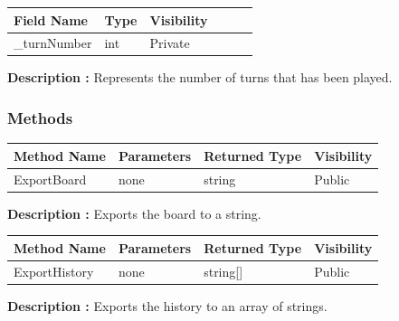 \documentclass[12pt]{article}
\begin{document}
\begin{table}[H]
    \begin{tabular}{llllll}
    \hline
    \multicolumn{1}{|l|}{\cellcolor[HTML]{EFEFEF}\textbf{Field Name}} & \multicolumn{1}{l|}{\cellcolor[HTML]{EFEFEF}\textbf{Type}} & \multicolumn{1}{l|}{\cellcolor[HTML]{EFEFEF}\textbf{Visibility}} \\ \hline
    \multicolumn{1}{|l|}{\_turnNumber}                                & \multicolumn{1}{l|}{int}                                   & \multicolumn{1}{l|}{Private}                                     \\ \hline
    \end{tabular}
\end{table}

\textbf{Description :} Represents the number of turns that has been played. 

\subsubsection{Methods}

\begin{table}[H]
    \begin{tabular}{|l|l|l|l|}
    \hline
    \rowcolor[HTML]{EFEFEF} 
    \cellcolor[HTML]{EFEFEF}\textbf{Method Name} & \textbf{Parameters}  & \textbf{Returned Type} & \textbf{Visibility} \\ \hline
    ExportBoard                                  & none                 & string                 & Public              \\ \hline
    \end{tabular}
\end{table}

\textbf{Description :} Exports the board to a string. 

\begin{table}[H]
    \begin{tabular}{|l|l|l|l|}
    \hline
    \rowcolor[HTML]{EFEFEF} 
    \cellcolor[HTML]{EFEFEF}\textbf{Method Name} & \textbf{Parameters}  & \textbf{Returned Type} & \textbf{Visibility} \\ \hline
    ExportHistory                                & none                 & string[]                 & Public            \\ \hline
    \end{tabular}
\end{table}

\textbf{Description :} Exports the history to an array of strings.   
\end{document}
